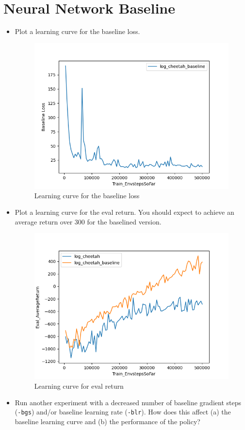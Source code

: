 \documentclass{article}
\begin{document}
\newpage\section{Neural Network Baseline}
\begin{itemize}
        \item Plot a learning curve for the baseline loss.

\MYSOLUTION

\begin{figure}[h]
        \centering
        \includegraphics[width=0.5\linewidth]{./report/assets/all_E2_baseline.png} %
        \caption{Learning curve for the baseline loss}
        \label{fig:E2_baseline_loss}
\end{figure}
        \item Plot a learning curve for the eval return. You should expect to achieve an average return over 300 for the baselined version.

\MYSOLUTION

\begin{figure}[h]
        \centering
        \includegraphics[width=0.5\linewidth]{./report/assets/all_E2.png} %
        \caption{Learning curve for eval return}
        \label{fig:eval_return_E2}
\end{figure}

        \item Run another experiment with a decreased number of baseline gradient steps (\verb|-bgs|) and/or baseline learning rate (\verb|-blr|). How does this affect (a) the baseline learning curve and (b) the performance of the policy?


\end{itemize}
\end{document}
